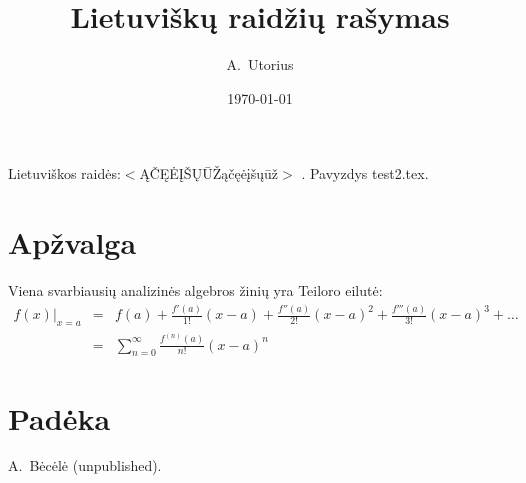 \documentclass{article}
\begin{document}
\author{A.\ Utorius}
\title{Lietuvi{\v s}kų raid{\v z}ių ra{\v s}ymas}
\date{\today}

\maketitle

Lietuviškos raid{\.e}s:$<$ĄČĘĖĮŠŲŪŽąčęėįšųūž$>$ \cite{ref1}.
Pavyzdys {\sf test2.tex}.

\section{Apžvalga}

Viena svarbiausių analizinės algebros žinių yra Teiloro eilutė:
\begin{align}
f(x)\big|_{x=a} &=& f(a)
 + \frac{f'(a)}{1!} (x-a)
 + \frac{f''(a)}{2!} (x-a)^2
 + \frac{f'''(a)}{3!} (x-a)^3
 + \dots \nonumber \\
 &=& \sum\limits_{n=0}^{\infty} \frac{f^{(n)}(a)}{n!} (x-a)^n
\end{align}

\section*{Padėka}

\textit{}

\begin{thebibliography}{99}
 A.\ Bėcėlė (unpublished).
\end{thebibliography}
\end{document}
